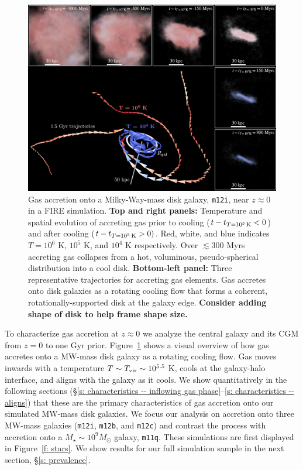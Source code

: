 \documentclass[fleqn,usenatbib]{mnras}
\newcommand{\tcon}{t_{T=10^5\,{\rm K}}}
\begin{document}
\begin{figure}
    \centering
    \includegraphics[width=\textwidth]{figures/illustrative_tracks/illustrative_tracks.png}
    \caption{
Gas accretion onto a Milky-Way-mass disk galaxy, \texttt{m12i}, near $z\approx0$ in a FIRE simulation.
\textbf{Top and right panels:}
Temperature and spatial evolution of accreting gas prior to cooling ($t-\tcon < 0$) and after cooling ($t-\tcon > 0)$.
Red, white, and blue indicates $T=10^6$ K, $10^5$ K, and $10^4$ K respectively.
Over $\lesssim 300$ Myrs accreting gas collapses from a hot, voluminous, pseudo-spherical distribution into a cool disk.
\textbf{Bottom-left panel:}
Three representative trajectories for accreting gas elements.
Gas accretes onto disk galaxies as a rotating cooling flow that forms a coherent, rotationally-supported disk at the galaxy edge.
\textbf{Consider adding shape of disk to help frame shape size.}
    }
    \label{f: overview}
\end{figure}

To characterize gas accretion at $z\approx0$ we analyze the central galaxy and its CGM from $z=0$ to one Gyr prior.
Figure~\ref{f: overview} shows a visual overview of how gas accretes onto a MW-mass disk galaxy as a rotating cooling flow.
Gas moves inwards with a temperature $T \sim T_{\rm vir} \sim 10^{5.5}$ K, cools at the galaxy-halo interface, and aligns with the galaxy as it cools.
We show quantitatively in the following sections (\S\ref{s: characteristics -- inflowing gas phase}--\ref{s: characteristics -- aligns}) that these are the primary characteristics of gas accretion onto our simulated MW-mass disk galaxies.
We focus our analysis on accretion onto three MW-mass galaxies (\texttt{m12i}, \texttt{m12b}, and \texttt{m12c}) and contrast the process with accretion onto a $M_\star \sim 10^9 M_\odot$ galaxy, \texttt{m11q}.
These simulations are first displayed in Figure~\ref{f: stars}.
We show results for our full simulation sample in the next section, \S\ref{s: prevalence}.
\end{document}
